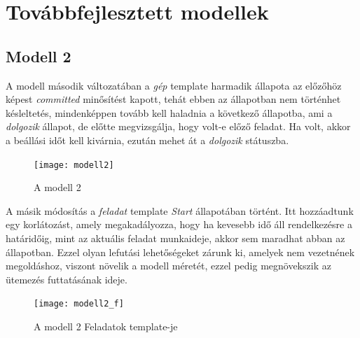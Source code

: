 \documentclass [12pt]{report}
\begin{document}
\section{Továbbfejlesztett modellek}
\subsection{Modell 2}
A modell második változatában a \emph{gép} template harmadik állapota az előzőhöz képest \emph{committed} minősítést kapott, tehát ebben az állapotban nem történhet késleltetés, mindenképpen tovább kell haladnia a következő állapotba, ami a \emph{dolgozik} állapot, de előtte megvizsgálja, hogy volt-e előző feladat. Ha volt, akkor a beállási időt kell kivárnia, ezután mehet át a \emph{dolgozik} státuszba.\\
\begin{figure}[htpb]
\begin{center}
\texttt{[image: modell2]}
\caption{A modell 2}
\end{center}
\end{figure}
A másik módosítás a \emph{feladat} template \emph{Start} állapotában történt. Itt hozzáadtunk egy korlátozást, amely megakadályozza, hogy ha kevesebb idő áll rendelkezésre a határidőig, mint az aktuális feladat munkaideje, akkor sem maradhat abban az állapotban. Ezzel olyan lefutási lehetőségeket zárunk ki, amelyek nem vezetnének megoldáshoz, viszont növelik a modell méretét, ezzel pedig megnövekszik az ütemezés futtatásának ideje.
\begin{figure}[htpb]
\begin{center}
\texttt{[image: modell2\_f]}
\caption{A modell 2 Feladatok template-je}
\end{center}
\end{figure}
\end{document}
